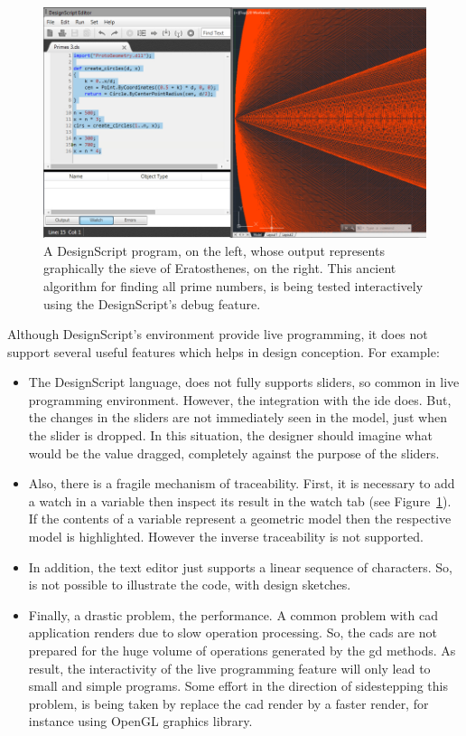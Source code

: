 \begin{figure}[!htbp]
  \centering
  \includegraphics[scale=0.25]{img/designScript}
    \caption{A DesignScript program, on the left, whose output represents graphically the sieve of Eratosthenes, on the right. This ancient algorithm for finding all prime numbers, is being tested interactively using the DesignScript's debug feature. }
  \label{fig:ds}
\end{figure}

Although DesignScript's environment provide live programming, it does not support several useful features which helps in design conception. For example: 

\begin{itemize}
 
\item The DesignScript language, does not fully supports sliders, so common in live programming environment. However, the integration with the \ac{ide} does. But, the changes in the sliders are not immediately seen in the model, just when the slider is dropped. In this situation, the designer should imagine what would be the value dragged, completely against the purpose of the sliders. 

\item Also, there is a fragile mechanism of traceability. First, it is necessary to add a watch in a variable then inspect its result in the watch tab (see Figure~\ref{fig:ds}). If the contents of a variable represent a geometric model then the respective model is highlighted. However the inverse traceability is not supported. 

\item In addition, the text editor just supports a linear sequence of characters. So, is not possible to illustrate the code, with design sketches. 

\item Finally, a drastic problem, the performance. A common problem with \ac{cad} application renders due to slow operation processing. So, the \ac{cad}s are not prepared for the huge volume of operations generated by the \ac{gd} methods. As result, the interactivity of the live programming feature will only lead to small and simple programs. Some effort in the direction of sidestepping this problem, is being taken by replace the \ac{cad} render by a faster render, for instance using OpenGL graphics library. 
\end{itemize}

